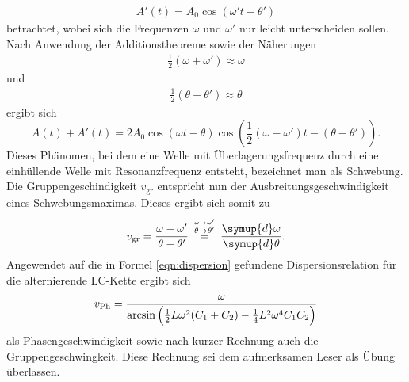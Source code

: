 \begin{align*}
A'(t) = A_0 \cos{(\omega' t - \theta')}
\end{align*}
betrachtet, wobei sich die Frequenzen $\omega$ und $\omega'$ nur leicht unterscheiden sollen.
Nach Anwendung der Additionstheoreme sowie der Näherungen
\begin{align*}
  \frac{1}{2}(\omega + \omega') \approx \omega
\end{align*}
und
\begin{align*}
  \frac{1}{2}(\theta + \theta') \approx \theta
\end{align*}
ergibt sich
\begin{equation}
A(t) + A'(t) = 2 A_0 \cos{(\omega t - \theta)} \cos{(\frac{1}{2} (\omega - \omega')t - (\theta - \theta'))}.
\end{equation}
Dieses Phänomen, bei dem eine Welle mit Überlagerungsfrequenz durch eine einhüllende Welle mit Resonanzfrequenz entsteht, bezeichnet man als Schwebung.
Die Gruppengeschindigkeit $v_{\text{gr}}$ entspricht nun der Ausbreitungsgeschwindigkeit eines Schwebungsmaximas.
Dieses ergibt sich somit zu
\begin{equation}
  \label{eqn:gruppe}
  v_{\text{gr}} = \frac{\omega - \omega'}{\theta - \theta'} \: \stackrel{\stackrel{\omega \to \omega'}{\theta \to \theta'}}{=} \: \frac{\symup{d}\omega}{\symup{d}\theta}.
\end{equation}
Angewendet auf die in Formel \ref{eqn:dispersion} gefundene Dispersionsrelation für die alternierende LC-Kette ergibt sich
\begin{equation}
  v_{\text{Ph}} = \frac{\omega}{\arcsin{\Bigl( \frac{1}{2} L \omega^2 (C_1 + C_2) - \frac{1}{4} L^2 \omega^4 C_1 C_2   \Bigr)}}
\end{equation}
als Phasengeschwindigkeit sowie nach kurzer Rechnung auch die Gruppengeschwingkeit.
Diese Rechnung sei dem aufmerksamen Leser als Übung überlassen.
